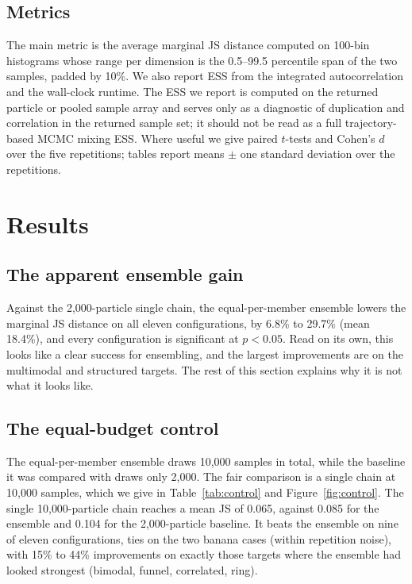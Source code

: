 \documentclass[11pt]{article}
\begin{document}
\subsection{Metrics}
The main metric is the average marginal JS distance computed on 100-bin
histograms whose range per dimension is the 0.5--99.5 percentile span of the
two samples, padded by 10\%. We also report ESS from the integrated
autocorrelation and the wall-clock runtime. The ESS we report is computed on
the returned particle or pooled sample array and serves only as a diagnostic
of duplication and correlation in the returned sample set; it should not be
read as a full trajectory-based MCMC mixing ESS. Where useful we give paired
$t$-tests and Cohen's $d$ over the five repetitions; tables report means $\pm$
one standard deviation over the repetitions.

\section{Results}

\subsection{The apparent ensemble gain}
\label{sec:apparent}
Against the 2{,}000-particle single chain, the equal-per-member ensemble
lowers the marginal JS distance on all eleven configurations, by 6.8\% to
29.7\% (mean 18.4\%), and every configuration is significant at $p<0.05$. Read
on its own, this looks like a clear success for ensembling, and the largest
improvements are on the multimodal and structured targets. The rest of this
section explains why it is not what it looks like.

\subsection{The equal-budget control}
\label{sec:control}
The equal-per-member ensemble draws 10{,}000 samples in total, while the
baseline it was compared with draws only 2{,}000. The fair comparison is a
single chain at 10{,}000 samples, which we give in Table~\ref{tab:control} and
Figure~\ref{fig:control}. The single 10{,}000-particle chain reaches a mean JS
of 0.065, against 0.085 for the ensemble and 0.104 for the 2{,}000-particle
baseline. It beats the ensemble on nine of eleven configurations, ties on the
two banana cases (within repetition noise), with 15\% to 44\% improvements on
exactly those targets where the ensemble had looked strongest (bimodal,
funnel, correlated, ring).
\end{document}
